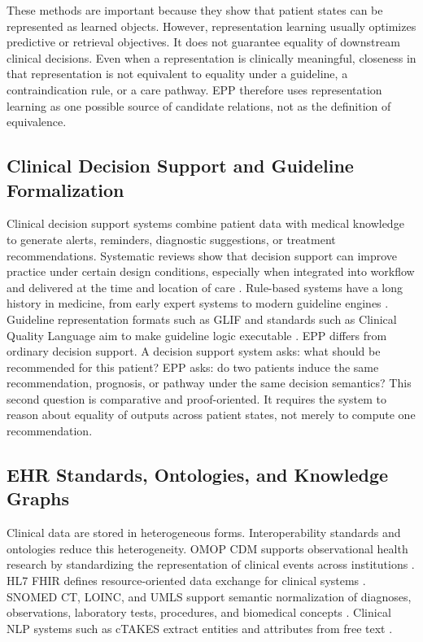 \documentclass[english,5p,twocolumn,preprint]{elsarticle}
\begin{document}
These methods are important because they show that patient states can be represented as learned objects. However, representation learning usually optimizes predictive or retrieval objectives. It does not guarantee equality of downstream clinical decisions. Even when a representation is clinically meaningful, closeness in that representation is not equivalent to equality under a guideline, a contraindication rule, or a care pathway. EPP therefore uses representation learning as one possible source of candidate relations, not as the definition of equivalence.

\subsection{Clinical Decision Support and Guideline Formalization}
Clinical decision support systems combine patient data with medical knowledge to generate alerts, reminders, diagnostic suggestions, or treatment recommendations. Systematic reviews show that decision support can improve practice under certain design conditions, especially when integrated into workflow and delivered at the time and location of care \cite{kawamoto2005cds,sutton2020cds}. Rule-based systems have a long history in medicine, from early expert systems to modern guideline engines \cite{shortliffe1975mycin}. Guideline representation formats such as GLIF and standards such as Clinical Quality Language aim to make guideline logic executable \cite{peleg2003glif,greenes2018cql}. EPP differs from ordinary decision support. A decision support system asks: what should be recommended for this patient? EPP asks: do two patients induce the same recommendation, prognosis, or pathway under the same decision semantics? This second question is comparative and proof-oriented. It requires the system to reason about equality of outputs across patient states, not merely to compute one recommendation.

\subsection{EHR Standards, Ontologies, and Knowledge Graphs}
Clinical data are stored in heterogeneous forms. Interoperability standards and ontologies reduce this heterogeneity. OMOP CDM supports observational health research by standardizing the representation of clinical events across institutions \cite{hripcsak2015ohdsi,overhage2012omop}. HL7 FHIR defines resource-oriented data exchange for clinical systems \cite{hl7fhir2024}. SNOMED CT, LOINC, and UMLS support semantic normalization of diagnoses, observations, laboratory tests, procedures, and biomedical concepts \cite{snomed2024,loinc2024,bodenreider2004umls}. Clinical NLP systems such as cTAKES extract entities and attributes from free text \cite{savova2010ctakes}. 
\end{document}
